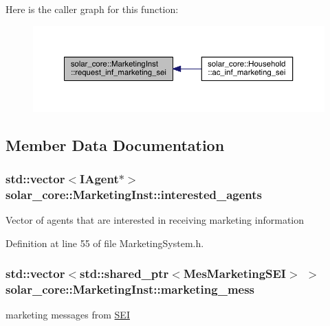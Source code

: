 Here is the caller graph for this function\+:\nopagebreak
\begin{figure}[H]
\begin{center}
\leavevmode
\includegraphics[width=350pt]{classsolar__core_1_1_marketing_inst_a0eb7c3b990063684a04c7b5f38138cbf_icgraph}
\end{center}
\end{figure}




\subsection{Member Data Documentation}
\hypertarget{classsolar__core_1_1_marketing_inst_a5e0f3d40db44d0779a944ecdad24d447}{}
\subsubsection[{interested\+\_\+agents}]{\setlength{\rightskip}{0pt plus 5cm}std\+::vector$<${\bf I\+Agent}$\ast$$>$ solar\+\_\+core\+::\+Marketing\+Inst\+::interested\+\_\+agents\hspace{0.3cm}{\ttfamily [protected]}}\label{classsolar__core_1_1_marketing_inst_a5e0f3d40db44d0779a944ecdad24d447}
Vector of agents that are interested in receiving marketing information 

Definition at line 55 of file Marketing\+System.\+h.

\hypertarget{classsolar__core_1_1_marketing_inst_af386df7399502fc26c6625600a68edb3}{}
\subsubsection[{marketing\+\_\+mess}]{\setlength{\rightskip}{0pt plus 5cm}std\+::vector$<$std\+::shared\+\_\+ptr$<${\bf Mes\+Marketing\+S\+E\+I}$>$ $>$ solar\+\_\+core\+::\+Marketing\+Inst\+::marketing\+\_\+mess\hspace{0.3cm}{\ttfamily [protected]}}\label{classsolar__core_1_1_marketing_inst_af386df7399502fc26c6625600a68edb3}
marketing messages from \hyperlink{classsolar__core_1_1_s_e_i}{S\+E\+I} 

